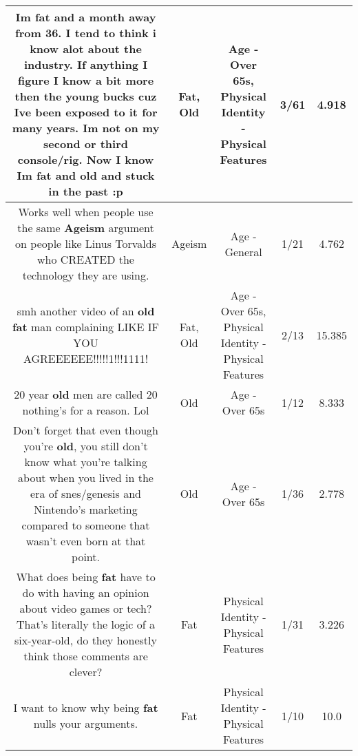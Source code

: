 \documentclass[11pt]{article}
\newlength\mylength
\begin{document}
\begin{center}
\begin{longtable}{|C{.65\mylength}|C{.30\mylength}|C{.12\mylength}|C{.12\mylength}|C{.12\mylength}|}
  \small Im \textbf{fat} and a month away from 36. I tend to think i know alot about the industry. If anything I figure I know a bit more then the young bucks cuz Ive been exposed to it for many years. Im not on my second or third console/rig. Now I know Im \textbf{fat} and \textbf{old} and stuck in the past :p\normalsize   & Fat, Old & Age - Over 65s, Physical Identity - Physical Features & 3/61 & 4.918 \\  \hline
  \small Works well when people use the same \textbf{Ageism} argument on people like Linus Torvalds who CREATED the technology they are using.\normalsize   & Ageism & Age - General & 1/21 & 4.762 \\  \hline
  \small smh another video of an \textbf{old} \textbf{fat} man complaining LIKE IF YOU AGREEEEEE!!!!!1!!!1111!\normalsize   & Fat, Old & Age - Over 65s, Physical Identity - Physical Features & 2/13 & 15.385 \\  \hline
  \small 20 year \textbf{old} men are called 20 nothing's for a reason.  Lol\normalsize   & Old & Age - Over 65s & 1/12 & 8.333 \\  \hline
  \small Don't forget that even though you're \textbf{old}, you still don't know what you're talking about when you lived in the era of snes/genesis and Nintendo's marketing compared to someone that wasn't even born at that point.\normalsize   & Old & Age - Over 65s & 1/36 & 2.778 \\  \hline
  \small What does being \textbf{fat} have to do with having an opinion about video games or tech?That's literally the logic of a six-year-old, do they honestly think those comments are clever?\normalsize   & Fat & Physical Identity - Physical Features & 1/31 & 3.226 \\  \hline
  \small I want to know why being \textbf{fat} nulls your arguments.\normalsize   & Fat & Physical Identity - Physical Features & 1/10 & 10.0 \\  \hline

\end{longtable}
\end{center}
\end{document}
